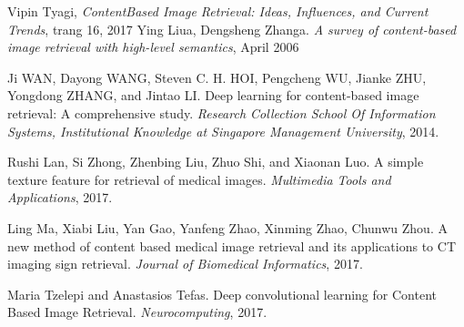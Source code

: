 \documentclass[a4paper,14pt]{extreport}
\begin{document}
\begin{thebibliography}{9}
Vipin Tyagi, \textit{ContentBased Image Retrieval: Ideas, Influences, and Current Trends}, trang 16, 2017
Ying Liua, Dengsheng Zhanga. \textit{A survey of content-based image retrieval with high-level semantics},  April 2006

Ji WAN, Dayong WANG, Steven C. H. HOI, Pengcheng WU, Jianke ZHU, Yongdong ZHANG, and Jintao LI.
Deep learning for content-based image retrieval: A comprehensive study.
\textit{Research Collection School Of Information Systems, Institutional Knowledge at Singapore Management University}, 2014.
 
Rushi Lan, Si Zhong, Zhenbing Liu, Zhuo Shi, and Xiaonan Luo.
A simple texture feature for retrieval of medical images.
\textit{Multimedia Tools and Applications}, 2017.
 
Ling Ma, Xiabi Liu, Yan Gao, Yanfeng Zhao, Xinming Zhao, Chunwu Zhou. A new method of content based medical image retrieval and its applications to CT imaging sign retrieval.
\textit{Journal of Biomedical Informatics}, 2017.

Maria Tzelepi and Anastasios Tefas. Deep convolutional learning for Content Based Image Retrieval.
\textit{Neurocomputing}, 2017.
\end{thebibliography}
\end{document}
